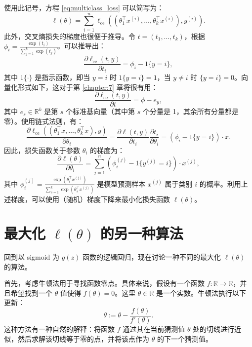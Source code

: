 使用此记号，方程 \eqref{eq:multiclass_loss} 可以简写为：
\begin{equation}
    \ell(\theta) = \sum_{i=1}^n \ell_{\text{ce}}((\theta_1^\top x^{(i)}, \dots, \theta_k^\top x^{(i)}), y^{(i)}).
\end{equation}
此外，交叉熵损失的梯度也很便于推导。令 $t = (t_1, \dots, t_k)$，根据 $\phi_i = \frac{\exp(t_i)}{\sum_{j=1}^k \exp(t_j)}$。可以推导出：
\begin{equation}
    \frac{\partial \ell_{\text{ce}}(t, y)}{\partial t_i} = \phi_i - {1}\{y=i\},
\end{equation}
其中 ${1}\{\cdot\}$ 是指示函数，即当 $y=i$ 时 ${1}\{y=i\} = 1$，当 $y \ne i$ 时 $\{y=i\} = 0$。向量化形式如下，这对于第 \ref{chapter:7} 章将很有用：
\begin{equation}
    \frac{\partial \ell_{\text{ce}}(t, y)}{\partial t} = \phi - e_y,\label{eq:2.17}
\end{equation}
其中 $e_s \in \mathbb{R}^k$ 是第 $s$ 个标准基向量（其中第 $s$ 个分量是 1，其余所有分量都是零）。使用链式法则，有：
\begin{equation}
    \frac{\partial \ell_{\text{ce}}((\theta_1^\top x, \dots, \theta_k^\top x), y)}{\partial \theta_i} = \frac{\partial \ell(t, y)}{\partial t_i} \frac{\partial t_i}{\partial \theta_i} = (\phi_i - {1}\{y=i\}) \cdot x.
\end{equation}
因此，损失函数关于参数 $\theta_i$ 的梯度为：
\begin{equation}
    \frac{\partial \ell(\theta)}{\partial \theta_i} = \sum_{j=1}^n (\phi_i^{(j)} - {1}\{y^{(j)}=i\}) \cdot x^{(j)},
\end{equation}
其中 $\phi_i^{(j)} = \frac{\exp(\theta_i^\top x^{(j)})}{\sum_{s=1}^k \exp(\theta_s^\top x^{(j)})}$ 是模型预测样本 $x^{(j)}$ 属于类别 $i$ 的概率。利用上述梯度，可以使用（随机）梯度下降来最小化损失函数 $\ell(\theta)$。

\section{最大化 \texorpdfstring{$\ell(\theta)$}{l(theta)} 的另一种算法}

回到以 sigmoid 为 $g(z)$ 函数的逻辑回归，现在讨论一种不同的最大化 $\ell(\theta)$ 的算法。

首先，考虑牛顿法用于寻找函数零点。具体来说，假设有一个函数 $f: \mathbb{R} \to \mathbb{R}$，并且希望找到一个 $\theta$ 值使得 $f(\theta) = 0$。这里 $\theta \in \mathbb{R}$ 是一个实数。牛顿法执行以下更新：
\[
    \theta := \theta - \frac{f(\theta)}{f'(\theta)}.
\]
这种方法有一种自然的解释：将函数 $f$ 通过其在当前猜测值 $\theta$ 处的切线进行近似，然后求解该切线等于零的点，并将该点作为 $\theta$ 的下一个猜测值。

